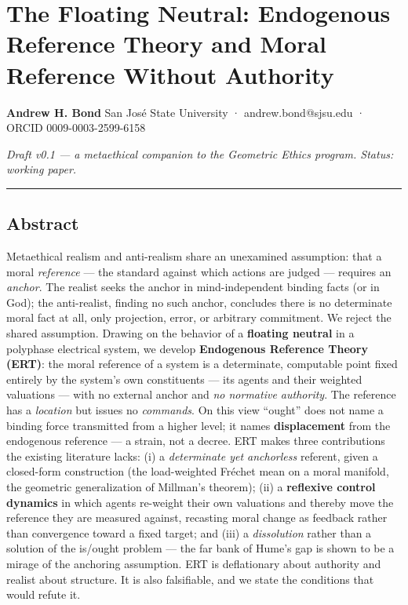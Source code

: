 \documentclass[
]{article}
\author{}
\date{}
\begin{document}
\section{The Floating Neutral: Endogenous Reference Theory and Moral
Reference Without
Authority}\label{the-floating-neutral-endogenous-reference-theory-and-moral-reference-without-authority}

\textbf{Andrew H. Bond} San José State University · andrew.bond@sjsu.edu
· ORCID 0009-0003-2599-6158

\emph{Draft v0.1 --- a metaethical companion to the Geometric Ethics
program. Status: working paper.}

\begin{center}\rule{0.5\linewidth}{0.5pt}\end{center}

\subsection{Abstract}\label{abstract}

Metaethical realism and anti-realism share an unexamined assumption:
that a moral \emph{reference} --- the standard against which actions are
judged --- requires an \emph{anchor}. The realist seeks the anchor in
mind-independent binding facts (or in God); the anti-realist, finding no
such anchor, concludes there is no determinate moral fact at all, only
projection, error, or arbitrary commitment. We reject the shared
assumption. Drawing on the behavior of a \textbf{floating neutral} in a
polyphase electrical system, we develop \textbf{Endogenous Reference
Theory (ERT)}: the moral reference of a system is a determinate,
computable point fixed entirely by the system's own constituents --- its
agents and their weighted valuations --- with no external anchor and
\emph{no normative authority}. The reference has a \emph{location} but
issues no \emph{commands}. On this view ``ought'' does not name a
binding force transmitted from a higher level; it names
\textbf{displacement} from the endogenous reference --- a strain, not a
decree. ERT makes three contributions the existing literature lacks: (i)
a \emph{determinate yet anchorless} referent, given a closed-form
construction (the load-weighted Fréchet mean on a moral manifold, the
geometric generalization of Millman's theorem); (ii) a \textbf{reflexive
control dynamics} in which agents re-weight their own valuations and
thereby move the reference they are measured against, recasting moral
change as feedback rather than convergence toward a fixed target; and
(iii) a \emph{dissolution} rather than a solution of the is/ought
problem --- the far bank of Hume's gap is shown to be a mirage of the
anchoring assumption. ERT is deflationary about authority and realist
about structure. It is also falsifiable, and we state the conditions
that would refute it.
\end{document}
